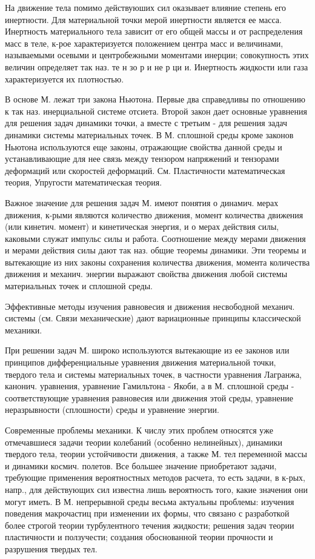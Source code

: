 \documentclass[10pt]{article}
\begin{document}
На движение тела помимо действуюших сил оказывает влияние степень его инертности. Для материальной точки мерой инертности является ее масса. Инертность материального тела зависит от его общей массы и от распределения масс в теле, к-рое характеризуется положением центра масс и величинами, называемыми осевыми и центробежными моментами инерции; совокупность этих величин определяет так наз. те н зо р и не р ци и. Инертность жидкости или газа характеризуется их плотностью.



В основе М. лежат три закона Ньютона. Первые два справедливы по отношению к так наз. инерциальной системе отсиета. Второй закон дает основные уравнения для решения задач динамики точки, а вместе с третьим - для решения задач динамики системы материальных точек. В М. сплошной среды кроме законов Ньютона используются еще законы, отражающие свойства данной среды и устанавливающие для нее связь между тензором напряжений и тензорами деформаций или скоростей деформаций. См. Пластичности математическая теория, Упругости математическая теория.



Важное значение для решения задач М. имеют понятия о динамич. мерах движения, к-рыми являются количество движения, момент количества движения (или кинетич. момент) и кинетическая энергия, и о мерах действия силы, каковыми служат импульс силы и работа. Соотношение между мерами движения и мерами действия силы дают так наз. общие теоремы динамики. Эти теоремы и вытекающие из них законы сохранения количества движения, момента количества движения и механич. энергии выражают свойства движения любой системы материальных точек и сплошной среды.



Эффективные методы изучения равновесия и движения несвободной механич. системы (см. Связи механические) дают вариационные принципы классической механики.



При решении задач М. широко используются вытекающие из ее законов или принципов дифференциальные уравнения движения материальной точки, твердого тела и системы материальных точек, в частности уравнения Лагранжа, канонич. уравнения, уравнение Гамильтона - Якоби, а в М. сплошной среды - соответствующие уравнения равновесия или движения этой среды, уравнение неразрывности (сплошности) среды и уравнение энергии.



Современные проблемы механики. К числу этих проблем относятся уже отмечавшиеся задачи теории колебаний (особенно нелинейных), динамики твердого тела, теории устойчивости движения, а также М. тел переменной массы и динамики космич. полетов. Все большее значение приобретают задачи, требующие применения вероятностных методов расчета, то есть задачи, в к-рых, напр., для действующих сил известна лишь вероятность того, какие значения они могут иметь. В М. непрерывной среды весьма актуальны проблемы: изучения поведения макрочастиц при изменении их формы, что связано с разработкой более строгой теории турбулентного течения жидкости; решения задач теории пластичности и ползучести; создания обоснованной теории прочности и разрушения твердых тел.
\end{document}
